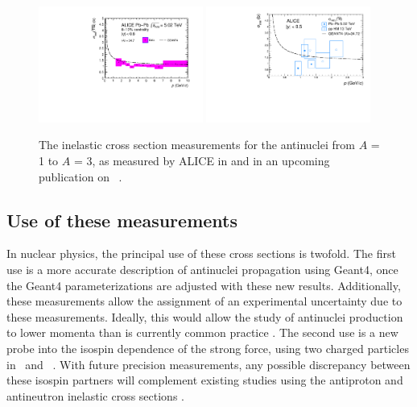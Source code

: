 \begin{figure}
    \includegraphics[width=0.48\textwidth]{figures/Antihelium_inelastic_cross_section_PbPb.pdf}
    \includegraphics[width=0.48\textwidth]{figures/FinalXS_antit_paper.pdf}
    \caption{The inelastic cross section measurements for the antinuclei from $A$ = 1 to $A$ = 3, as measured by ALICE in \cite{antideuteronXS, antiHe3XS} and in an upcoming publication on \atrit\ . }
    \label{fig:AntinucleiInelasticCross_Sections_Full}
\end{figure}

\subsection{Use of these measurements}
In nuclear physics, the principal use of these cross sections is twofold. The first use is a more accurate description of antinuclei propagation using Geant4, once the Geant4 parameterizations are adjusted with these new results. Additionally, these measurements allow the assignment of an experimental uncertainty due to these measurements. Ideally, this would allow the study of antinuclei production to lower momenta than is currently common practice \cite{4He_production, helium3_flow_5TeV, deuteron_pp_13TeV, deuteron_pp_7TeV, deuteron_PbPb_276TeV, deuteron_pPbALICE}. The second use is a new probe into the isospin dependence of the strong force, using two charged particles in \ahe\ and \atrit\ . With future precision measurements, any possible discrepancy between these isospin partners will complement existing studies using the antiproton and antineutron inelastic cross sections \cite{Bianconi_2014}.\\


